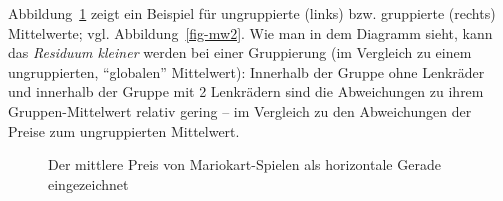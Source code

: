 \documentclass[
  letterpaper,
]{scrbook}
\theoremstyle{definition}
\theoremstyle{definition}
\theoremstyle{definition}
\theoremstyle{remark}
\begin{document}
Abbildung~\ref{fig-mw3} zeigt ein Beispiel für ungruppierte (links) bzw.
gruppierte (rechts) Mittelwerte; vgl. Abbildung~\ref{fig-mw2}. Wie man
in dem Diagramm sieht, kann das \emph{Residuum kleiner} werden bei einer
Gruppierung (im Vergleich zu einem ungruppierten, ``globalen''
Mittelwert): Innerhalb der Gruppe ohne Lenkräder und innerhalb der
Gruppe mit 2 Lenkrädern sind die Abweichungen zu ihrem
Gruppen-Mittelwert relativ gering -- im Vergleich zu den Abweichungen
der Preise zum ungruppierten Mittelwert.

\begin{figure}

\begin{minipage}{0.50\linewidth}



\end{minipage}%
%
\begin{minipage}{0.50\linewidth}



\end{minipage}%

\caption{\label{fig-mw3}Der mittlere Preis von Mariokart-Spielen als
horizontale Gerade eingezeichnet}

\end{figure}%
\end{document}
